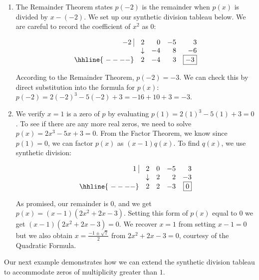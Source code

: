 \begin{exampleSol}

\begin{enumerate}

\item  The Remainder Theorem states $p(-2)$ is the remainder when $p(x)$ is divided by $x-(-2)$.  We set up our synthetic division tableau below.  We are careful to record the coefficient of $x^2$ as $0$:

\[\begin{array}{rrrrr}
 -2 \, \, \vline& 2 & 0 & -5  & 3 \\

   & \downarrow &  -4  &  8  & -6 \\ \hhline{~----} 
  & 2  &   -4  & 3 &  \fbox{$-3$}  \\  
\end{array}\]

According to the Remainder Theorem, $p(-2) = -3$.  We can check this by direct substitution into the formula for $p(x)$:  $p(-2) = 2(-2)^3-5(-2)+3 = -16+10+3=-3$.

\item We verify $x=1$ is a zero of $p$ by evaluating $p(1) = 2(1)^3-5(1)+3 = 0$.  To see if there are any more real zeros, we need to solve $p(x) = 2x^3-5x+3 = 0$.  From the Factor Theorem, we know since $p(1) = 0$,  we can factor $p(x)$ as $(x-1)q(x)$.  To find $q(x)$, we use synthetic division:

\[\begin{array}{rrrrr}
 1 \, \, \vline& 2 & 0 & -5  & 3 \\

   & \downarrow &  2  &  2  & -3 \\ \hhline{~----} 
  & 2  &   2  & -3 &  \fbox{$0$}  \\  
\end{array}\]

As promised, our remainder is $0$, and we get  $p(x) = (x-1)\left( 2x^2 + 2x - 3\right)$.  Setting this form of $p(x)$ equal to  $0$ we get $(x-1)\left( 2x^2 + 2x - 3\right) = 0$.  We recover  $x = 1$ from setting $x-1=0$  but we also obtain $x = \frac{-1 \pm \sqrt{7}}{2}$ from  $2x^2 + 2x - 3=0$, courtesy of the Quadratic Formula.  
\end{enumerate}
\end{exampleSol}

Our next example demonstrates how we can extend the synthetic division tableau to accommodate zeros of multiplicity greater than $1$.

